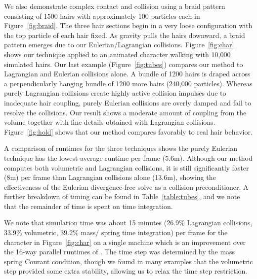 We also demonstrate complex contact and collision
using a braid pattern consisting of 1500 hairs with approximately 100 particles
each in Figure~\ref{fig:braid}.
The three hair sections begin in a very loose configuration with the top particle of
each hair fixed.  As gravity pulls the hairs downward, a braid pattern emerges
due to our Eulerian/Lagrangian collisions.
Figure~\ref{fig:char} shows our technique applied to an animated
character walking with 10,000 simulated hairs. 
Our last example (Figure~\ref{fig:tubes}) compares our method to
Lagrangian and Eulerian collisions alone. A bundle of 1200 hairs is draped
across a perpendicularly hanging bundle of 1200 more hairs (240,000
particles). Whereas purely Lagrangian collisions create highly active collision
impulses due to inadequate hair coupling, purely Eulerian collisions are overly damped and
fail to resolve the collisions.  Our result shows a moderate amount of coupling
from the volume together with fine details obtained with Lagrangian collisions.
Figure~\ref{fig:hold} shows that our method  compares favorably to real hair behavior.  

A comparison of runtimes for the three techniques shows the purely Eulerian
technique has the lowest average runtime per frame (5.6m).  Although our
method computes both volumetric and Lagrangian collisions, it is still
significantly faster (8m) per frame than
Lagrangian collisions alone (13.6m), showing the effectiveness of the Eulerian
divergence-free solve as a collision preconditioner.  A further breakdown of
timing can be found in Table~\ref{table:tubes}, and we note that the remainder
of time is spent on time integration.


We note that simulation time was about 15 minutes (26.9\% Lagrangian
collisions, 33.9\% volumetric, 39.2\% mass/ spring time integration)
per frame for the character in Figure~\ref{fig:char} on a single machine which is an
improvement over the 16-way parallel runtimes of \cite{selle:2008:hair}. 
The time step was determined by the mass spring Courant condition, though we found
in many examples that the volumetric step provided some extra stability,
allowing us to relax the time step restriction.


